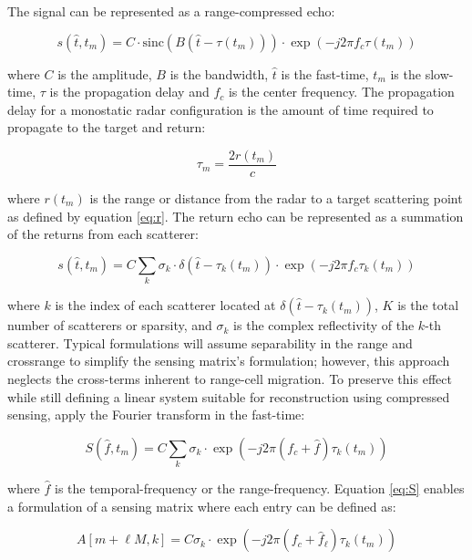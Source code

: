 \documentclass[]{spie}  %
\begin{document}
 The signal can be represented as a range-compressed echo:

\begin{equation}
    s(\hat{t},t_{m}) = C \cdot \text{sinc}(B(\hat{t} - \tau(t_{m})))\cdot \exp(-j2 \pi f_{c} \tau(t_{m}))
\end{equation}

\noindent where $C$ is the amplitude, $B$ is the bandwidth, $\hat{t}$ is the fast-time, $t_{m}$ is the slow-time, $\tau$ is the propagation delay and $f_{c}$ is the center frequency. The propagation delay for a monostatic radar configuration is the amount of time required to propagate to the target and return:

\begin{equation}
    \tau_{m} = \frac{2r(t_{m})}{c}
\end{equation}

\noindent where $r(t_{m})$ is the range or distance from the radar to a target scattering point as defined by equation \ref{eq:r}. The return echo can be represented as a summation of the returns from each scatterer:

\begin{equation}
    s(\hat{t},t_{m}) = C \sum_{k} \sigma_{k} \cdot \delta(\hat{t} - \tau_{k}(t_{m})) \cdot \exp(-j2 \pi f_{c} \tau_{k}(t_{m}))
\end{equation}

\noindent where $k$ is the index of each scatterer located at $\delta(\hat{t} - \tau_{k}(t_{m}))$, $K$ is the total number of scatterers or sparsity, and $\sigma_{k}$ is the complex reflectivity of the $k$-th scatterer. Typical formulations will assume separability in the range and crossrange to simplify the sensing matrix's formulation; however, this approach neglects the cross-terms inherent to range-cell migration. To preserve this effect while still defining a linear system suitable for reconstruction using compressed sensing, apply the Fourier transform in the fast-time:

\begin{equation}
    S(\hat{f},t_{m}) = C \sum_{k} \sigma_{k} \cdot \exp(-j2 \pi (f_{c} + \hat{f}) \tau_{k}(t_{m}))
    \label{eq:S}
\end{equation}

\noindent where $\hat{f}$ is the temporal-frequency or the range-frequency. Equation \ref{eq:S} enables a formulation of a sensing matrix where each entry can be defined as:

\begin{equation}
    A[{m + \ell M}, k] = C \sigma_{k} \cdot \exp(-j2 \pi (f_{c} + \hat{f}_{\ell}) \tau_{k}(t_{m}))
\end{equation}
\end{document}
